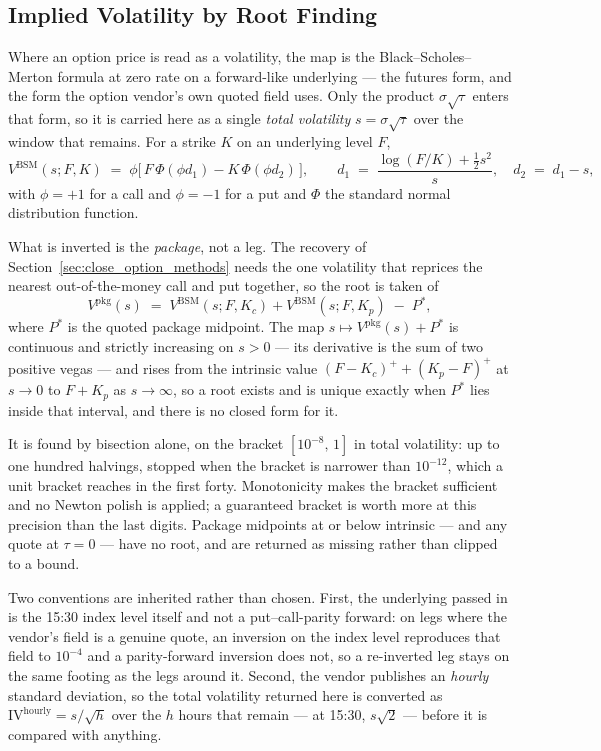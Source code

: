 \subsection{Implied Volatility by Root Finding}
\label{sec:bsm_rootfinding}

Where an option price is read as a volatility, the map is the
Black--Scholes--Merton formula \citep{BlackScholes1973,Merton1973} at zero
rate on a forward-like underlying --- the futures form, and the form the
option vendor's own quoted field uses. Only the product $\sigma\sqrt{\tau}$
enters that form, so it is carried here as a single \emph{total volatility}
$s=\sigma\sqrt{\tau}$ over the window that remains. For a strike $K$ on an
underlying level $F$,
\begin{equation}
    V^{\mathrm{BSM}}(s; F, K)
    \;=\; \phi \bigl[\, F\,\Phi(\phi d_1) - K\,\Phi(\phi d_2) \,\bigr],
    \qquad
    d_1 \;=\; \frac{\log(F/K) + \tfrac{1}{2}s^{2}}{s},
    \quad
    d_2 \;=\; d_1 - s,
    \label{eq:bsm}
\end{equation}
with $\phi=+1$ for a call and $\phi=-1$ for a put and $\Phi$ the standard
normal distribution function.

What is inverted is the \emph{package}, not a leg. The recovery of
Section~\ref{sec:close_option_methods} needs the one volatility that
reprices the nearest out-of-the-money call and put together, so the root
is taken of
\begin{equation}
    V^{\mathrm{pkg}}(s)
    \;=\;
    V^{\mathrm{BSM}}(s; F, K_c) + V^{\mathrm{BSM}}(s; F, K_p)
    \;-\; P^{\ast},
    \label{eq:bsm_package}
\end{equation}
where $P^{\ast}$ is the quoted package midpoint. The map
$s \mapsto V^{\mathrm{pkg}}(s) + P^{\ast}$ is continuous and strictly
increasing on $s>0$ --- its derivative is the sum of two positive vegas ---
and rises from the intrinsic value $(F-K_c)^{+}+(K_p-F)^{+}$ at
$s \to 0$ to $F+K_p$ as $s \to \infty$, so a root exists and is unique
exactly when $P^{\ast}$ lies inside that interval, and there is no closed
form for it.

It is found by bisection alone, on the bracket $[10^{-8},\,1]$ in total
volatility: up to one hundred halvings, stopped when the bracket is
narrower than $10^{-12}$, which a unit bracket reaches in the first forty.
Monotonicity makes the bracket sufficient and no Newton polish is applied;
a guaranteed bracket is worth more at this precision than the last digits.
Package midpoints at or below intrinsic --- and any quote at $\tau=0$ ---
have no root, and are returned as missing rather than clipped to a bound.

Two conventions are inherited rather than chosen. First, the underlying
passed in is the 15:30 index level itself and not a put--call-parity
forward: on legs where the vendor's field is a genuine quote, an inversion
on the index level reproduces that field to $10^{-4}$ and a parity-forward
inversion does not, so a re-inverted leg stays on the same footing as the
legs around it. Second, the vendor publishes an \emph{hourly} standard
deviation, so the total volatility returned here is converted as
$\mathrm{IV}^{\mathrm{hourly}} = s/\sqrt{h}$ over the $h$ hours that
remain --- at 15:30, $s\sqrt{2}$ --- before it is compared with anything.
